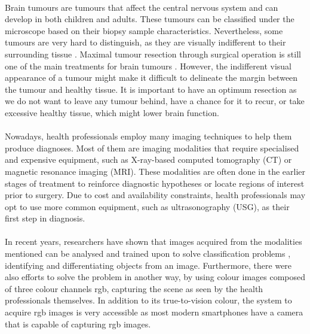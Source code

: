 \documentclass[12pt,oneside]{report}
\begin{document}
\paragraph{}
Brain tumours are tumours that affect the central nervous system and can develop in both children and adults. These tumours can be classified under the microscope based on their biopsy sample characteristics. Nevertheless, some tumours are very hard to distinguish, as they are visually indifferent to their surrounding tissue \cite{collins_brain_2004}. Maximal tumour resection through surgical operation is still one of the main treatments for brain tumours \cite{bush_current_2017}. However, the indifferent visual appearance of a tumour might make it difficult to delineate the margin between the tumour and healthy tissue. It is important to have an optimum resection as we do not want to leave any tumour behind, have a chance for it to recur, or take excessive healthy tissue, which might lower brain function.

\paragraph{}
Nowadays, health professionals employ many imaging techniques to help them produce diagnoses. Most of them are imaging modalities that require specialised and expensive equipment, such as X-ray-based computed tomography (CT) or magnetic resonance imaging (MRI). These modalities are often done in the earlier stages of treatment to reinforce diagnostic hypotheses or locate regions of interest prior to surgery. Due to cost and availability constraints, health professionals may opt to use more common equipment, such as ultrasonography (USG), as their first step in diagnosis.

\paragraph{}
In recent years, researchers have shown that images acquired from the modalities mentioned can be analysed and trained upon to solve classification problems \cite{wang_image_2020}, identifying and differentiating objects from an image. Furthermore, there were also efforts to solve the problem in another way, by using colour images composed of three colour channels \acrfull{rgb}, capturing the scene as seen by the health professionals themselves. In addition to its true-to-vision colour, the system to acquire \acrshort{rgb} images is very accessible as most modern smartphones have a camera that is capable of capturing \acrshort{rgb} images.
\end{document}

